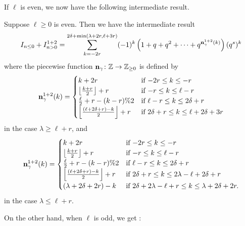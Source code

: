 If $\ell$ is even, we now have the following intermediate result.
\begin{proposition}
  \label{prop:ell_even_half}
  Suppose $\ell \ge 0$ is even.
  Then we have the intermediate result
  \[
    I_{n \le 0} + I_{n > 0}^{\text{1+2}}
    = \sum_{k = -2r}^{2\delta + \min(\lambda+2r, \ell+3r)}
    (-1)^k \left( 1 + q + q^2 + \dots + q^{\mathbf n^{1+2}_{\gamma}(k)}  \right) (q^s)^k
  \]
  where the piecewise function $\mathbf n_\gamma \colon \mathbb Z \to \mathbb Z_{\ge 0}$ is defined by
  \[
    \mathbf n^{1+2}_\gamma(k) =
    \begin{cases}
      k + 2r & \text{if } {-2r} \le k \le -r \\
      \left\lfloor \frac{k+r}{2} \right\rfloor + r & \text{if }{-r} \le k \le \ell-r \\
      \frac{\ell}{2} + r - (k-r)\%2 & \text{if } \ell - r \le k \le 2\delta + r \\
      \left\lfloor \frac{(\ell+2\delta+r)-k}{2} \right\rfloor + r & \text{if } 2\delta + r \le k \le \ell + 2\delta + 3r
    \end{cases}
  \]
  in the case $\lambda \ge \ell+r$, and
  \[
    \mathbf n^{1+2}_\gamma(k) =
    \begin{cases}
      k + 2r & \text{if } {-2r} \le k \le -r \\
      \left\lfloor \frac{k+r}{2} \right\rfloor + r & \text{if }{-r} \le k \le \ell-r \\
      \frac{\ell}{2} + r - (k-r) \% 2 & \text{if } \ell - r \le k \le 2\delta + r \\
      \left\lfloor \frac{(\ell+2\delta+r)-k}{2} \right\rfloor + r & \text{if } 2\delta + r \le k \le 2\lambda - \ell + 2\delta + r \\
      (\lambda + 2\delta + 2r) - k & \text{if } 2 \delta + 2 \lambda - \ell + r \le k \le \lambda + 2\delta + 2r.
    \end{cases}
  \]
  in the case $\lambda \le \ell+r$.
\end{proposition}

On the other hand, when $\ell$ is odd, we get :
\ellodd*

